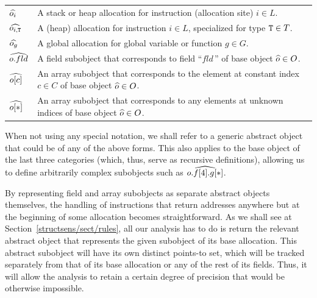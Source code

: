 \begin{minipage}{\linewidth}
  \renewcommand{\arraystretch}{1.5}
  \begin{tabular}{@{--\ }l@{\quad}p{}}
    $\widehat{o_i}$
    & A stack or heap allocation for instruction (allocation site) $i \in L$.
    \\[3pt]
    $\widehat{o_{i,\texttt{T}}}$
    & A (heap) allocation for instruction $i \in L$, specialized for type
      $\texttt{T} \in T$.
    \\[3pt]
    $\widehat{o_{g}}$
    & A global allocation for global variable or function $g \in G$.
    \\[3pt]
    $\widehat{o.fld}$
    & A field subobject that corresponds to field ``$fld\,$'' of base object
      $\widehat{o} \in O$.
    \\[3pt]
    $\widehat{o[c]}$
    & An array subobject that corresponds to the element at constant
      index $c \in C$ of base object $\widehat{o} \in O$.
    \\[1pt]
    $\widehat{o[*]}$
    & An array subobject that corresponds to any elements at unknown
      indices of base object $\widehat{o} \in O$.
    \\
  \end{tabular}
\end{minipage}

\noindent
When not using any special notation, we shall refer to a generic
abstract object that could be of any of the above forms. This also
applies to the base object of the last three categories (which, thus,
serve as recursive definitions), allowing us to define arbitrarily
complex subobjects such as \(\widehat{o.f[4].g[*]}\).

By representing field and array subobjects as separate abstract
objects themselves, the handling of instructions that return addresses
anywhere but at the beginning of some allocation becomes
straightforward. As we shall see at
Section~\ref{structsens/sect/rules}, all our analysis has to do is
return the relevant abstract object that represents the given
subobject of its base allocation. This abstract subobject will have
its own distinct points-to set, which will be tracked separately from
that of its base allocation or any of the rest of its fields. Thus, it
will allow the analysis to retain a certain degree of precision that
would be otherwise impossible.

